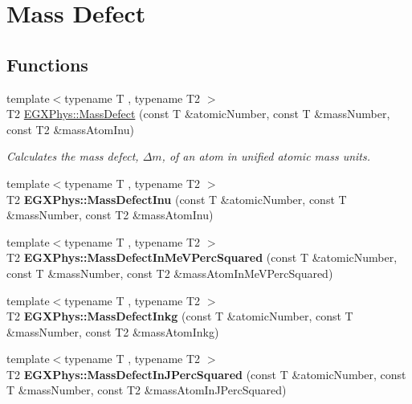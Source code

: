 \hypertarget{group___e_g_x_phys-_mass_defect}{}\section{Mass Defect}
\label{group___e_g_x_phys-_mass_defect}
\subsection*{Functions}
\begin{DoxyCompactItemize}
\item 
{\footnotesize template$<$typename T , typename T2 $>$ }\\T2 \mbox{\hyperlink{group___e_g_x_phys-_mass_defect_gae89f2dfa65992c0314adc2440b2f582a}{E\+G\+X\+Phys\+::\+Mass\+Defect}} (const T \&atomic\+Number, const T \&mass\+Number, const T2 \&mass\+Atom\+Inu)
\begin{DoxyCompactList}\small\item\em Calculates the mass defect, $\Delta m$, of an atom in unified atomic mass units. \end{DoxyCompactList}\item 
\mbox{\label{group___e_g_x_phys-_mass_defect_ga70400004a5cb622de372ab84670731ef}} 
{\footnotesize template$<$typename T , typename T2 $>$ }\\T2 {\bfseries E\+G\+X\+Phys\+::\+Mass\+Defect\+Inu} (const T \&atomic\+Number, const T \&mass\+Number, const T2 \&mass\+Atom\+Inu)
\item 
\mbox{\label{group___e_g_x_phys-_mass_defect_gab51169bf871d0ea0ee0642fa300228fe}} 
{\footnotesize template$<$typename T , typename T2 $>$ }\\T2 {\bfseries E\+G\+X\+Phys\+::\+Mass\+Defect\+In\+Me\+V\+Perc\+Squared} (const T \&atomic\+Number, const T \&mass\+Number, const T2 \&mass\+Atom\+In\+Me\+V\+Perc\+Squared)
\item 
\mbox{\label{group___e_g_x_phys-_mass_defect_gad5378933021e13598a76bd8581b1e887}} 
{\footnotesize template$<$typename T , typename T2 $>$ }\\T2 {\bfseries E\+G\+X\+Phys\+::\+Mass\+Defect\+Inkg} (const T \&atomic\+Number, const T \&mass\+Number, const T2 \&mass\+Atom\+Inkg)
\item 
\mbox{\label{group___e_g_x_phys-_mass_defect_ga08cff1dfa3259af8f1b67ec741796e91}} 
{\footnotesize template$<$typename T , typename T2 $>$ }\\T2 {\bfseries E\+G\+X\+Phys\+::\+Mass\+Defect\+In\+J\+Perc\+Squared} (const T \&atomic\+Number, const T \&mass\+Number, const T2 \&mass\+Atom\+In\+J\+Perc\+Squared)
\end{DoxyCompactItemize}


